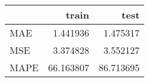 \begin{tabular}{lrr}
\toprule
{} &      train &       test \\
\midrule
MAE  &   1.441936 &   1.475317 \\
MSE  &   3.374828 &   3.552127 \\
MAPE &  66.163807 &  86.713695 \\
\bottomrule
\end{tabular}

